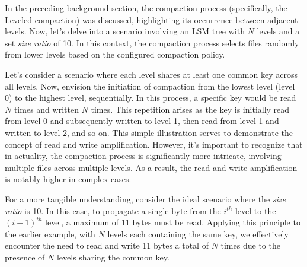 In the preceding background section, the compaction process (specifically, the Leveled compaction) was discussed, 
highlighting its occurrence between adjacent levels. Now, let's delve into a scenario involving an LSM tree with $N$ 
levels and a set \textit{size ratio} of 10. In this context, the compaction process selects files randomly from lower 
levels based on the configured compaction policy.

Let's consider a scenario where each level shares at least one common key across all levels. Now, envision the 
initiation of compaction from the lowest level (level 0) to the highest level, sequentially. In this process, a 
specific key would be read $N$ times and written $N$ times. This repetition arises as the key is initially read from 
level 0 and subsequently written to level 1, then read from level 1 and written to level 2, and so on. This simple 
illustration serves to demonstrate the concept of read and write amplification. However, it's important to recognize 
that in actuality, the compaction process is significantly more intricate, involving multiple files across multiple 
levels. As a result, the read and write amplification is notably higher in complex cases.

For a more tangible understanding, consider the ideal scenario where the \textit{size ratio} is 10. In this case, to 
propagate a single byte from the $i^{th}$ level to the $(i+1)^{th}$ level, a maximum of 11 bytes must be read.
Applying this principle to the earlier example, with $N$ levels each containing the same key, we effectively encounter 
the need to read and write 11 bytes a total of $N$ times due to the presence of $N$ levels sharing the common key.